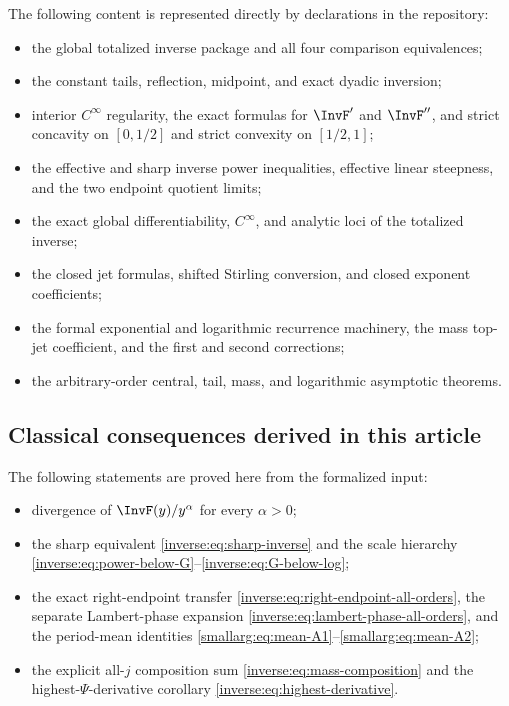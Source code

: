 \documentclass[11pt,oneside]{article}
\theoremstyle{definition}
\theoremstyle{remark}
\begin{document}
The following content is represented directly by declarations in the
repository:
\begin{itemize}
\item the global totalized inverse package and all four comparison
equivalences;
\item the constant tails, reflection, midpoint, and exact dyadic
inversion;
\item interior $C^\infty$ regularity, the exact formulas for $\InvF'$ and
$\InvF''$, and strict concavity on $[0,1/2]$ and strict convexity on
$[1/2,1]$;
\item the effective and sharp inverse power inequalities, effective
linear steepness, and the two endpoint quotient limits;
\item the exact global differentiability, $C^\infty$, and analytic loci
of the totalized inverse;
\item the closed jet formulas, shifted Stirling conversion, and closed
exponent coefficients;
\item the formal exponential and logarithmic recurrence machinery,
the mass top-jet coefficient, and the first and second corrections;
\item the arbitrary-order central, tail, mass, and logarithmic
asymptotic theorems.
\end{itemize}

\subsection{Classical consequences derived in this article}

The following statements are proved here from the formalized input:
\begin{itemize}
\item divergence of $\InvF(y)/y^\alpha$ for every $\alpha>0$;
\item the sharp equivalent \eqref{inverse:eq:sharp-inverse} and the scale
hierarchy \eqref{inverse:eq:power-below-G}--\eqref{inverse:eq:G-below-log};
\item the exact right-endpoint transfer
\eqref{inverse:eq:right-endpoint-all-orders}, the separate Lambert-phase expansion
\eqref{inverse:eq:lambert-phase-all-orders}, and the period-mean identities
\eqref{smallarg:eq:mean-A1}--\eqref{smallarg:eq:mean-A2};
\item the explicit all-$j$ composition sum \eqref{inverse:eq:mass-composition}
and the highest-$\Psi$-derivative corollary
\eqref{inverse:eq:highest-derivative}.
\end{itemize}
\end{document}
